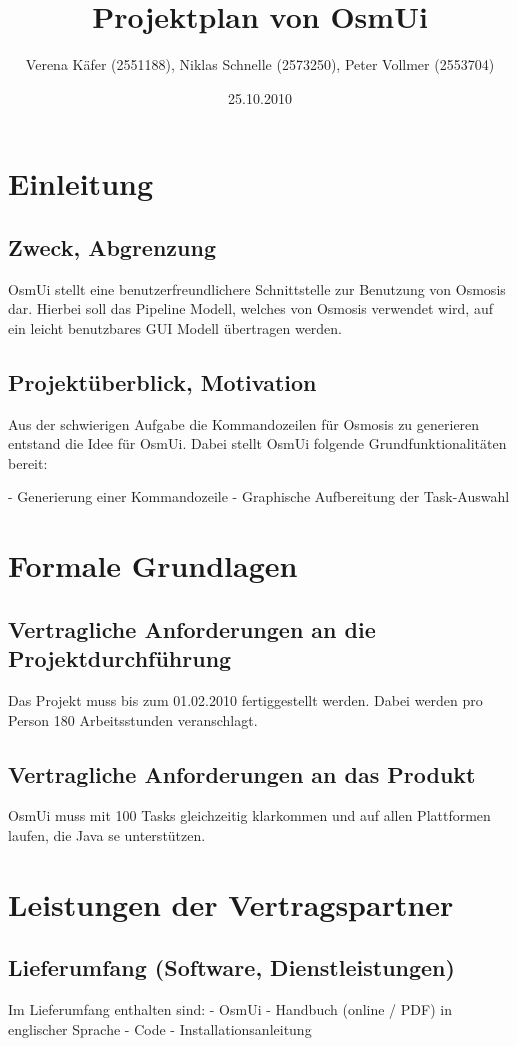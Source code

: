 \documentclass[a4paper,10pt]{scrartcl}
\author{Verena Käfer (2551188), Niklas Schnelle (2573250), Peter Vollmer (2553704)}
\date{25.10.2010}
\title{Projektplan von OsmUi}
\begin{document}
\maketitle
\newpage
\tableofcontents
\newpage


\section{Einleitung}
\subsection{Zweck, Abgrenzung}
OsmUi stellt eine benutzerfreundlichere Schnittstelle zur Benutzung von Osmosis dar. Hierbei soll das Pipeline Modell, welches von Osmosis verwendet wird, auf ein leicht benutzbares GUI Modell übertragen werden. 
\subsection{Projektüberblick, Motivation}
Aus der schwierigen Aufgabe die Kommandozeilen für Osmosis zu generieren entstand die Idee für OsmUi. Dabei stellt OsmUi folgende Grundfunktionalitäten bereit:

- Generierung einer Kommandozeile
- Graphische Aufbereitung der Task-Auswahl



\section{Formale Grundlagen}
\subsection{Vertragliche Anforderungen an die Projektdurchführung}
Das Projekt muss bis zum 01.02.2010 fertiggestellt werden. Dabei werden pro Person 180 Arbeitsstunden veranschlagt.
\subsection{Vertragliche Anforderungen an das Produkt}
OsmUi muss mit 100 Tasks gleichzeitig klarkommen und auf allen Plattformen laufen, die Java se unterstützen. 


\section{Leistungen der Vertragspartner}
\subsection{Lieferumfang (Software, Dienstleistungen)}
Im Lieferumfang enthalten sind:
- OsmUi
- Handbuch (online / PDF) in englischer Sprache
- Code
- Installationsanleitung
\end{document}
